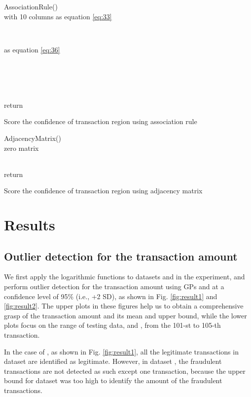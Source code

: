 \documentclass[final,authoryear,5p,times,twocolumn]{elsarticle}
\begin{document}
\begin{algorithm}[h!]
AssociationRule() \\
\For{()}
{
 with 10 columns as equation \eqref{eq:33}
}
{
	 \\
	\While{}
	{
		\Case{}
			{
				
			}
			{
				as equation \eqref{eq:36}
			}
	
	}
}
 \\
 \\
 \\
 \\
return 
\caption{Score the confidence of transaction region using association rule}
\end{algorithm}
\begin{algorithm}[h]
AdjacencyMatrix() \\
 zero matrix \\
\For{}
{
	
}
\ForEach{}
{
	
}
 \\
return 
\caption{Score the confidence of transaction region using adjacency matrix}
\end{algorithm}

\section{Results}
\label{section:Sec5}


\subsection{Outlier detection for the transaction amount}

We first apply the logarithmic functions to datasets  and  in the experiment, and perform outlier detection for the transaction amount using GPs and  at a confidence level of 95\% (i.e., +2 SD), as shown in Fig. \ref{fig:result1} and \ref{fig:result2}. The upper plots in these figures help us to obtain a comprehensive grasp of the transaction amount and its mean and upper bound, while the lower plots focus on the range of testing data,  and , from the 101-st to 105-th transaction.

In the case of , as shown in Fig. \ref{fig:result1}, all the legitimate transactions in dataset  are identified as legitimate. However, in dataset , the fraudulent transactions are not detected as such except one transaction, because the upper bound for dataset  was too high to identify the amount of the fraudulent transactions.
\end{document}
